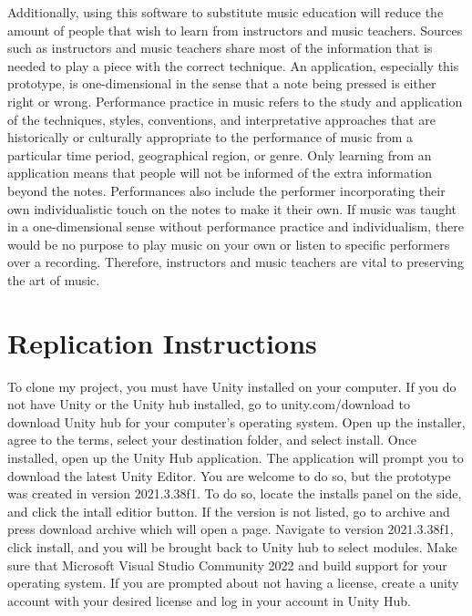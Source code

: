 \documentclass[10pt,twocolumn]{article}
\begin{document}
Additionally, using this software to substitute music education will reduce the amount of people that wish to learn from instructors and music teachers. Sources such as instructors and music teachers share most of the information that is needed to play a piece with the correct technique. An application, especially this prototype, is one-dimensional in the sense that a note being pressed is either right or wrong. Performance practice in music refers to the study and application of the techniques, styles, conventions, and interpretative approaches that are historically or culturally appropriate to the performance of music from a particular time period, geographical region, or genre. Only learning from an application means that people will not be informed of the extra information beyond the notes. Performances also include the performer incorporating their own individualistic touch on the notes to make it their own. If music was taught in a one-dimensional sense without performance practice and individualism, there would be no purpose to play music on your own or listen to specific performers over a recording. Therefore, instructors and music teachers are vital to preserving the art of music.

\printbibliography

\appendix
\appendixpage
\addappheadtotoc
\section{Replication Instructions}

To clone my project, you must have Unity installed on your computer. If you do not have Unity or the Unity hub installed, go to unity.com/download to download Unity hub for your computer's operating system. Open up the installer, agree to the terms, select your destination folder, and select install. Once installed, open up the Unity Hub application. The application will prompt you to download the latest Unity Editor. You are welcome to do so, but the prototype was created in version 2021.3.38f1. To do so, locate the installs panel on the side, and click the intall editior button. If the version is not listed, go to archive and press download archive which will open a page. Navigate to version 2021.3.38f1, click install, and you will be brought back to Unity hub to select modules. Make sure that Microsoft Visual Studio Community 2022 and build support for your operating system. If you are prompted about not having a license, create a unity account with your desired license and log in your account in Unity Hub. 
\end{document}

